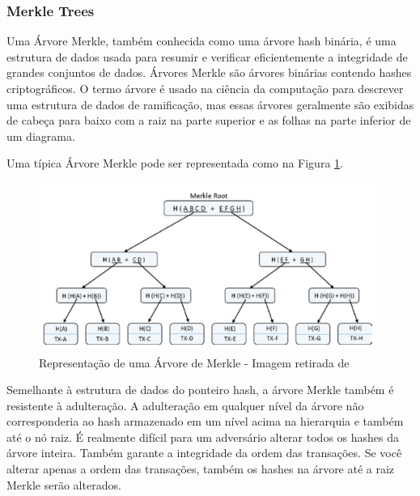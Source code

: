         \subsubsection{Merkle Trees}
  
            Uma Árvore Merkle, também conhecida como uma árvore hash binária, é uma estrutura de dados usada para resumir e verificar eficientemente a integridade de grandes conjuntos de dados. Árvores Merkle são árvores binárias contendo hashes criptográficos. O termo árvore é usado na ciência da computação para descrever uma estrutura de dados de ramificação, mas essas árvores geralmente são exibidas de cabeça para baixo com a raiz na parte superior e as folhas na parte inferior de um diagrama.\cite{mastering_blockchain_andreas}
            
            Uma típica Árvore Merkle pode ser representada como na Figura \ref{fig:merkle_tree_representation}.
        
                \begin{figure}[h]
                     \centering
                     \includegraphics[scale=0.7]{figuras/capitulo_2/merkle_tree_representation.png}
                     \caption{Representação de uma Árvore de Merkle - Imagem retirada de \cite{beginnig_blockchain_bikramaditya}}
                     \label{fig:merkle_tree_representation}
                \end{figure}

            Semelhante à estrutura de dados do ponteiro hash, a árvore Merkle também é resistente à adulteração. A adulteração em qualquer nível da árvore não corresponderia ao hash armazenado em um nível acima na hierarquia e também até o nó raiz. É realmente difícil para um adversário alterar todos os hashes da árvore inteira. Também garante a integridade da ordem das transações. Se você alterar apenas a ordem das transações, também os hashes na árvore até a raiz Merkle serão alterados.\cite{beginnig_blockchain_bikramaditya}


